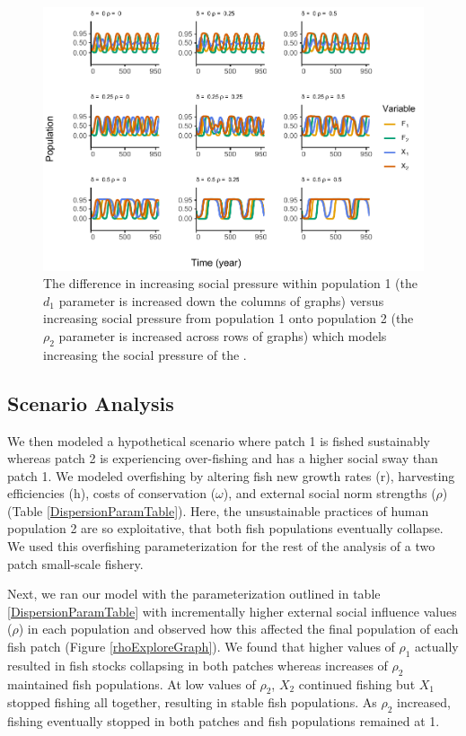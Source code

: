 \documentclass[
  12pt,
]{article}
\begin{document}
\begin{figure}
\centering
\includegraphics{Wulfing_CH2_Draft4_files/figure-latex/influenceAsym-1.pdf}
\caption{\label{fig:influenceAsym}The difference in increasing social pressure within population 1 (the \(d_1\) parameter is increased down the columns of graphs) versus increasing social pressure from population 1 onto population 2 (the \(\rho_2\) parameter is increased across rows of graphs) which models increasing the social pressure of the . \label{influenceAsym}}
\end{figure}

\subsection{Scenario Analysis}\label{scenario-analysis}

We then modeled a hypothetical scenario where patch 1 is fished sustainably whereas patch 2 is experiencing over-fishing and has a higher social sway than patch 1. We modeled overfishing by altering fish new growth rates (r), harvesting efficiencies (h), costs of conservation (\(\omega\)), and external social norm strengths (\(\rho\)) (Table \ref{DispersionParamTable}). Here, the unsustainable practices of human population 2 are so exploitative, that both fish populations eventually collapse. We used this overfishing parameterization for the rest of the analysis of a two patch small-scale fishery.



Next, we ran our model with the parameterization outlined in table \ref{DispersionParamTable} with incrementally higher external social influence values (\(\rho\)) in each population and observed how this affected the final population of each fish patch (Figure \ref{rhoExploreGraph}). We found that higher values of \(\rho_1\) actually resulted in fish stocks collapsing in both patches whereas increases of \(\rho_2\) maintained fish populations. At low values of \(\rho_2\), \(X_2\) continued fishing but \(X_1\) stopped fishing all together, resulting in stable fish populations. As \(\rho_2\) increased, fishing eventually stopped in both patches and fish populations remained at 1.
\end{document}
